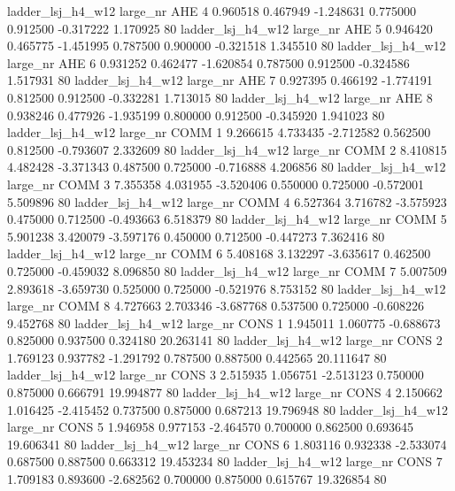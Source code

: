   ladder_lsj_h4_w12   large_nr      AHE                 4  0.960518  0.467949  -1.248631 0.775000 0.912500 -0.317222    1.170925 80
  ladder_lsj_h4_w12   large_nr      AHE                 5  0.946420  0.465775  -1.451995 0.787500 0.900000 -0.321518    1.345510 80
  ladder_lsj_h4_w12   large_nr      AHE                 6  0.931252  0.462477  -1.620854 0.787500 0.912500 -0.324586    1.517931 80
  ladder_lsj_h4_w12   large_nr      AHE                 7  0.927395  0.466192  -1.774191 0.812500 0.912500 -0.332281    1.713015 80
  ladder_lsj_h4_w12   large_nr      AHE                 8  0.938246  0.477926  -1.935199 0.800000 0.912500 -0.345920    1.941023 80
  ladder_lsj_h4_w12   large_nr     COMM                 1  9.266615  4.733435  -2.712582 0.562500 0.812500 -0.793607    2.332609 80
  ladder_lsj_h4_w12   large_nr     COMM                 2  8.410815  4.482428  -3.371343 0.487500 0.725000 -0.716888    4.206856 80
  ladder_lsj_h4_w12   large_nr     COMM                 3  7.355358  4.031955  -3.520406 0.550000 0.725000 -0.572001    5.509896 80
  ladder_lsj_h4_w12   large_nr     COMM                 4  6.527364  3.716782  -3.575923 0.475000 0.712500 -0.493663    6.518379 80
  ladder_lsj_h4_w12   large_nr     COMM                 5  5.901238  3.420079  -3.597176 0.450000 0.712500 -0.447273    7.362416 80
  ladder_lsj_h4_w12   large_nr     COMM                 6  5.408168  3.132297  -3.635617 0.462500 0.725000 -0.459032    8.096850 80
  ladder_lsj_h4_w12   large_nr     COMM                 7  5.007509  2.893618  -3.659730 0.525000 0.725000 -0.521976    8.753152 80
  ladder_lsj_h4_w12   large_nr     COMM                 8  4.727663  2.703346  -3.687768 0.537500 0.725000 -0.608226    9.452768 80
  ladder_lsj_h4_w12   large_nr     CONS                 1  1.945011  1.060775  -0.688673 0.825000 0.937500  0.324180   20.263141 80
  ladder_lsj_h4_w12   large_nr     CONS                 2  1.769123  0.937782  -1.291792 0.787500 0.887500  0.442565   20.111647 80
  ladder_lsj_h4_w12   large_nr     CONS                 3  2.515935  1.056751  -2.513123 0.750000 0.875000  0.666791   19.994877 80
  ladder_lsj_h4_w12   large_nr     CONS                 4  2.150662  1.016425  -2.415452 0.737500 0.875000  0.687213   19.796948 80
  ladder_lsj_h4_w12   large_nr     CONS                 5  1.946958  0.977153  -2.464570 0.700000 0.862500  0.693645   19.606341 80
  ladder_lsj_h4_w12   large_nr     CONS                 6  1.803116  0.932338  -2.533074 0.687500 0.887500  0.663312   19.453234 80
  ladder_lsj_h4_w12   large_nr     CONS                 7  1.709183  0.893600  -2.682562 0.700000 0.875000  0.615767   19.326854 80
